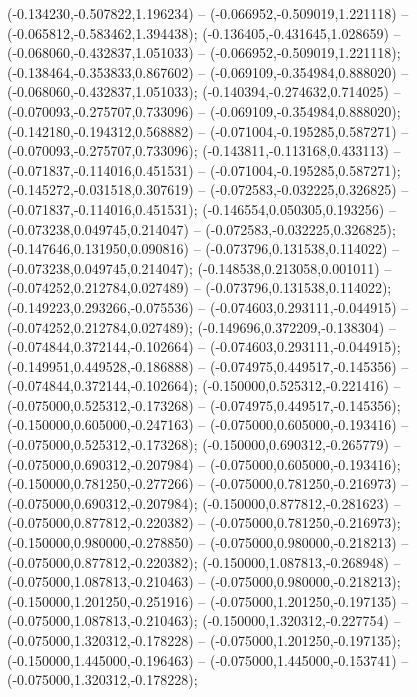  (-0.134230,-0.507822,1.196234) -- (-0.066952,-0.509019,1.221118) -- (-0.065812,-0.583462,1.394438);
 (-0.136405,-0.431645,1.028659) -- (-0.068060,-0.432837,1.051033) -- (-0.066952,-0.509019,1.221118);
 (-0.138464,-0.353833,0.867602) -- (-0.069109,-0.354984,0.888020) -- (-0.068060,-0.432837,1.051033);
 (-0.140394,-0.274632,0.714025) -- (-0.070093,-0.275707,0.733096) -- (-0.069109,-0.354984,0.888020);
 (-0.142180,-0.194312,0.568882) -- (-0.071004,-0.195285,0.587271) -- (-0.070093,-0.275707,0.733096);
 (-0.143811,-0.113168,0.433113) -- (-0.071837,-0.114016,0.451531) -- (-0.071004,-0.195285,0.587271);
 (-0.145272,-0.031518,0.307619) -- (-0.072583,-0.032225,0.326825) -- (-0.071837,-0.114016,0.451531);
 (-0.146554,0.050305,0.193256) -- (-0.073238,0.049745,0.214047) -- (-0.072583,-0.032225,0.326825);
 (-0.147646,0.131950,0.090816) -- (-0.073796,0.131538,0.114022) -- (-0.073238,0.049745,0.214047);
 (-0.148538,0.213058,0.001011) -- (-0.074252,0.212784,0.027489) -- (-0.073796,0.131538,0.114022);
 (-0.149223,0.293266,-0.075536) -- (-0.074603,0.293111,-0.044915) -- (-0.074252,0.212784,0.027489);
 (-0.149696,0.372209,-0.138304) -- (-0.074844,0.372144,-0.102664) -- (-0.074603,0.293111,-0.044915);
 (-0.149951,0.449528,-0.186888) -- (-0.074975,0.449517,-0.145356) -- (-0.074844,0.372144,-0.102664);
 (-0.150000,0.525312,-0.221416) -- (-0.075000,0.525312,-0.173268) -- (-0.074975,0.449517,-0.145356);
 (-0.150000,0.605000,-0.247163) -- (-0.075000,0.605000,-0.193416) -- (-0.075000,0.525312,-0.173268);
 (-0.150000,0.690312,-0.265779) -- (-0.075000,0.690312,-0.207984) -- (-0.075000,0.605000,-0.193416);
 (-0.150000,0.781250,-0.277266) -- (-0.075000,0.781250,-0.216973) -- (-0.075000,0.690312,-0.207984);
 (-0.150000,0.877812,-0.281623) -- (-0.075000,0.877812,-0.220382) -- (-0.075000,0.781250,-0.216973);
 (-0.150000,0.980000,-0.278850) -- (-0.075000,0.980000,-0.218213) -- (-0.075000,0.877812,-0.220382);
 (-0.150000,1.087813,-0.268948) -- (-0.075000,1.087813,-0.210463) -- (-0.075000,0.980000,-0.218213);
 (-0.150000,1.201250,-0.251916) -- (-0.075000,1.201250,-0.197135) -- (-0.075000,1.087813,-0.210463);
 (-0.150000,1.320312,-0.227754) -- (-0.075000,1.320312,-0.178228) -- (-0.075000,1.201250,-0.197135);
 (-0.150000,1.445000,-0.196463) -- (-0.075000,1.445000,-0.153741) -- (-0.075000,1.320312,-0.178228);
